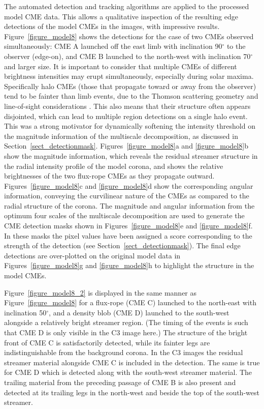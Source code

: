 \documentclass[preprint2]{aastex}
\begin{document}
The automated detection and tracking algorithms are applied to the processed model CME data. This allows a qualitative inspection of the resulting edge detections of the model CMEs in the images, with impressive results. Figure~\ref{figure_model8} shows the detections for the case of two CMEs observed simultaneously: CME A launched off the east limb with inclination 90$^{\circ}$ to the observer (edge-on), and CME B launched to the north-west with inclination 70$^{\circ}$ and larger size. It is important to consider that multiple CMEs of different brightness intensities may erupt simultaneously, especially during solar maxima. Specifically halo CMEs (those that propagate toward or away from the observer) tend to be fainter than limb events, due to the Thomson scattering geometry and line-of-sight considerations \citep{2006ApJ...642.1216V}. This also means that their structure often appears disjointed, which can lead to multiple region detections on a single halo event. This was a strong motivator for dynamically softening the intensity threshold on the magnitude information of the multiscale decomposition, as discussed in Section~\ref{sect_detectionmask}. Figures~\ref{figure_model8}a and \ref{figure_model8}b show the magnitude information, which reveals the residual streamer structure in the radial intensity profile of the model corona, and shows the relative brightnesses of the two flux-rope CMEs as they propagate outward. Figures~\ref{figure_model8}c and \ref{figure_model8}d show the corresponding angular information, conveying the curvilinear nature of the CMEs as compared to the radial structure of the corona. The magnitude and angular information from the optimum four scales of the multiscale decomposition are used to generate the CME detection masks shown in Figures~\ref{figure_model8}e and \ref{figure_model8}f. In these masks the pixel values have been assigned a score corresponding to the strength of the detection (see Section~\ref{sect_detectionmask}). The final edge detections are over-plotted on the original model data in Figures~\ref{figure_model8}g and \ref{figure_model8}h to highlight the structure in the model CMEs.

Figure~\ref{figure_model8_2} is displayed in the same manner as Figure~\ref{figure_model8} for a flux-rope (CME C) launched to the north-east with inclination 50$^{\circ}$, and a density blob (CME D) launched to the south-west alongside a relatively bright streamer region. (The timing of the events is such that CME D is only visible in the C3 image here.) The structure of the bright front of CME C is satisfactorily detected, while its fainter legs are indistinguishable from the background corona. In the C3 images the residual streamer material alongside CME C is included in the detection. The same is true for CME D which is detected along with the south-west streamer material. The trailing material from the preceding passage of CME B is also present and detected at its trailing legs in the north-west and beside the top of the south-west streamer.
\end{document}
